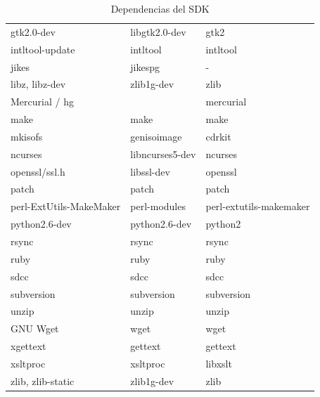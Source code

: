 \documentclass[12pt, twoside]{article}
\begin{document}
\begin{table}[!htbp]
{\begin{tabular}{|l|l|l|}
                    gtk2.0-dev              & libgtk2.0-dev     & gtk2                      \\
                    intltool-update         & intltool          & intltool                  \\
                    jikes                   & jikespg           & -                         \\
                    libz, libz-dev          & zlib1g-dev        & zlib                      \\
                    Mercurial / hg          &                   & mercurial                 \\
                    make                    & make              & make                      \\
                    mkisofs                 & genisoimage       & cdrkit                    \\
                    ncurses                 & libncurses5-dev   & ncurses                   \\
                    openssl/ssl.h           & libssl-dev        & openssl                   \\
                    patch                   & patch             & patch                     \\
                    perl-ExtUtils-MakeMaker & perl-modules      & perl-extutils-makemaker   \\
                    python2.6-dev           & python2.6-dev     & python2                   \\
                    rsync                   & rsync             & rsync                     \\
                    ruby                    & ruby              & ruby                      \\
                    sdcc                    & sdcc              & sdcc                      \\
                    subversion              & subversion        & subversion                \\
                    unzip                   & unzip             & unzip                     \\
                    GNU Wget                & wget              & wget                      \\
                    xgettext                & gettext           & gettext                   \\
                    xsltproc                & xsltproc          & libxslt                   \\
                    zlib, zlib-static       & zlib1g-dev        & zlib                      \\
                    \hline
                \end{tabular}
            }
        \caption{Dependencias del SDK}
        \label{tab:sdk_dependences}
    \end{table}
\end{document}
